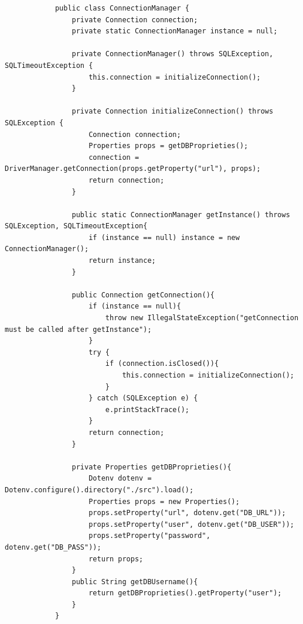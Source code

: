     \begin{listing}[H]
        \begin{verbatim}
            public class ConnectionManager {
                private Connection connection;
                private static ConnectionManager instance = null;
            
                private ConnectionManager() throws SQLException, SQLTimeoutException {
                    this.connection = initializeConnection();
                }
            
                private Connection initializeConnection() throws SQLException {
                    Connection connection;
                    Properties props = getDBProprieties();
                    connection = DriverManager.getConnection(props.getProperty("url"), props);
                    return connection;
                }
            
                public static ConnectionManager getInstance() throws SQLException, SQLTimeoutException{
                    if (instance == null) instance = new ConnectionManager();
                    return instance;
                }
            
                public Connection getConnection(){
                    if (instance == null){
                        throw new IllegalStateException("getConnection must be called after getInstance");
                    }
                    try {
                        if (connection.isClosed()){
                            this.connection = initializeConnection();
                        }
                    } catch (SQLException e) {
                        e.printStackTrace();
                    }
                    return connection;
                }
            
                private Properties getDBProprieties(){
                    Dotenv dotenv = Dotenv.configure().directory("./src").load();
                    Properties props = new Properties();
                    props.setProperty("url", dotenv.get("DB_URL"));
                    props.setProperty("user", dotenv.get("DB_USER"));
                    props.setProperty("password", dotenv.get("DB_PASS"));
                    return props;
                }
                public String getDBUsername(){
                    return getDBProprieties().getProperty("user");
                }
            }
        \end{verbatim}
        \caption{Implementazione della classe \texttt{ConnectionManager}}
        \label{lst:connectionManager}
    \end{listing}

